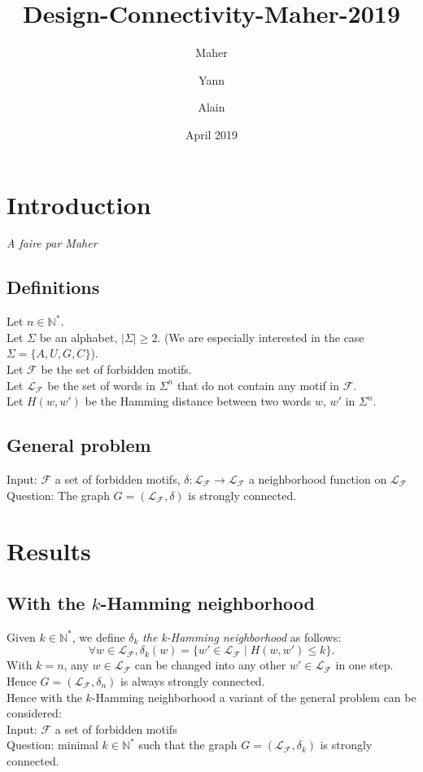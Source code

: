\documentclass{article}
\title{Design-Connectivity-Maher-2019}
\author{Maher \and Yann \and Alain}
\date{April 2019}
\begin{document}
\maketitle

\newtheorem{result}{Result}

\newcommand{\PosInt}{\mathbb{N}^*}
\newcommand{\Forb}{\mathcal{F}}
\newcommand{\Lang}[1]{\mathcal{L}_{#1}}
\newcommand{\Hamming}[2]{H(#1,#2)}



\section{Introduction}
{\it A faire par Maher}

\subsection*{Definitions}

Let $n \in \PosInt$. \\
Let $\Sigma$ be an alphabet, $|\Sigma| \geq 2$. (We are especially interested in the case $\Sigma = \{A, U, G, C\}$). \\
Let $\Forb$ be the set of forbidden motifs. \\
Let $\Lang{\Forb}$ be the set of words in $\Sigma^n$ that do not contain any motif in $\Forb$. \\
Let $H(w,w')$ be the Hamming distance between two words $w$, $w'$ in $\Sigma^n$.

\subsection*{General problem}

Input: $\Forb$ a set of forbidden motifs, $\delta: \Lang{\Forb} \rightarrow \Lang{\Forb}$ a neighborhood function on $\Lang{\Forb}$ \\
Question: The graph $G = (\Lang{\Forb}, \delta)$ is strongly connected.

\section{Results}
\subsection{With the $k$-Hamming neighborhood}

Given $k \in \PosInt$, we define $\delta_k$ {\it the k-Hamming neighborhood} as follows:
$$\forall w \in \Lang{\Forb},  \delta_k(w) = \{w'\in \mathcal{L}_{\Forb} \mid \Hamming{w}{w'}\le k\}. $$
With $k = n$, any $w \in \Lang{\Forb}$ can be changed into any other $w' \in \Lang{\Forb}$ in one step. Hence $G = (\Lang{\Forb}, \delta_n)$ is always strongly connected. \\
Hence with the $k$-Hamming neighborhood a variant of the general problem can be considered: \\
\newline
Input: $\Forb$ a set of forbidden motifs \\
Question: minimal $k \in \PosInt$ such that the graph $G = (\Lang{\Forb}, \delta_k)$ is strongly connected.
\end{document}
